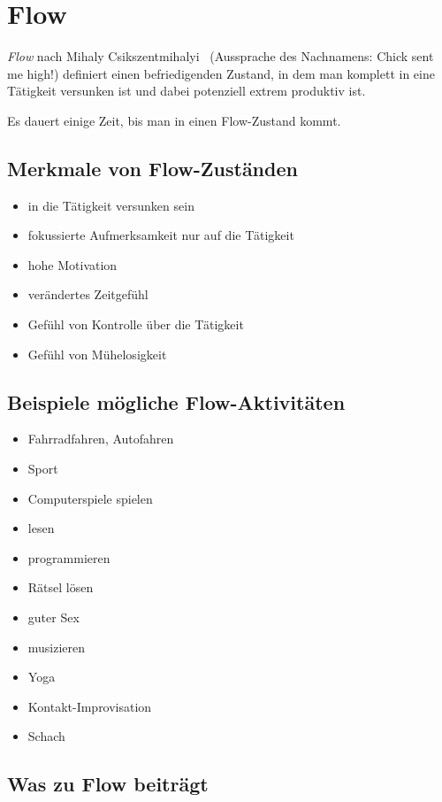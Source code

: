 \section{Flow}
\label{flow}

\emph{Flow} nach Mihaly Csikszentmihalyi~\cite{flow} (Aussprache des Nachnamens: \glqq Chick sent me high!\grqq) definiert einen befriedigenden Zustand, in dem man komplett in eine Tätigkeit versunken ist und dabei potenziell extrem produktiv ist.

Es dauert einige Zeit, bis man in einen Flow-Zustand kommt.


\subsection{Merkmale von Flow-Zuständen}

\begin{itemize}
  \item \glqq in die Tätigkeit versunken sein\grqq
  \item fokussierte Aufmerksamkeit nur auf die Tätigkeit
  \item hohe Motivation
  \item verändertes Zeitgefühl
  \item Gefühl von Kontrolle über die Tätigkeit
  \item Gefühl von Mühelosigkeit
\end{itemize}


\subsection{Beispiele mögliche Flow-Aktivitäten}

\begin{itemize}
  \item Fahrradfahren, Autofahren
  \item Sport
  \item Computerspiele spielen
  \item lesen
  \item programmieren
  \item Rätsel lösen
  \item guter Sex
  \item musizieren
  \item Yoga
  \item Kontakt-Improvisation
  \item Schach
\end{itemize}


\subsection{Was zu Flow beiträgt}

